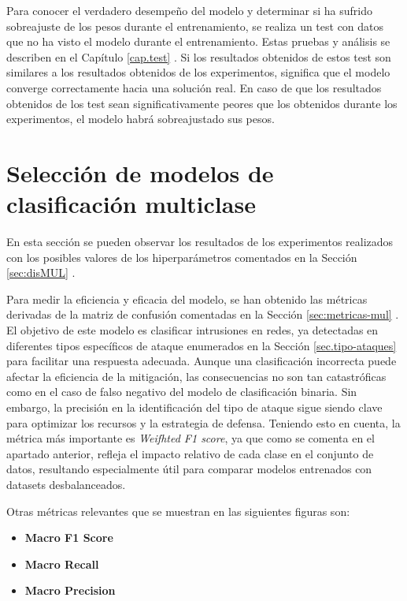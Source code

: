 Para conocer el verdadero desempeño del modelo y determinar si ha sufrido sobreajuste de los pesos durante el entrenamiento, se realiza un test con datos que no ha visto el modelo durante el entrenamiento. Estas pruebas y análisis se describen en el Capítulo \ref{cap.test} . Si los resultados obtenidos de estos test son similares a los resultados obtenidos de los experimentos, significa que el modelo converge correctamente hacia una solución real. En caso de que los resultados obtenidos de los test sean significativamente peores que los obtenidos durante los experimentos, el modelo habrá sobreajustado sus pesos. 



\section{Selección de modelos de clasificación multiclase}
En esta sección se pueden observar los resultados de los experimentos realizados con los posibles valores de los hiperparámetros comentados en la Sección \ref{sec:disMUL} .

Para medir la eficiencia y eficacia del modelo, se han obtenido las métricas derivadas de la matriz de confusión comentadas en la Sección \ref{sec:metricas-mul} . El objetivo de este modelo es clasificar intrusiones en redes, ya detectadas en diferentes tipos específicos de ataque enumerados en la Sección \ref{sec.tipo-ataques} para facilitar una respuesta adecuada. Aunque una clasificación incorrecta puede afectar la eficiencia de la mitigación, las consecuencias no son tan catastróficas como en el caso de falso negativo del modelo de clasificación binaria. Sin embargo, la precisión en la identificación del tipo de ataque sigue siendo clave para optimizar los recursos y la estrategia de defensa.
Teniendo esto en cuenta, la métrica más importante es \textit{Weifhted F1 score}, ya que como se comenta en el apartado anterior, refleja el impacto relativo de cada clase en el conjunto de datos, resultando especialmente útil para comparar modelos entrenados con datasets desbalanceados.

Otras métricas relevantes que se muestran en las siguientes figuras son:
\begin{itemize}
	\item \textbf{Macro F1 Score}%
	\item \textbf{Macro Recall}%
	\item \textbf{Macro Precision}%
\end{itemize}

